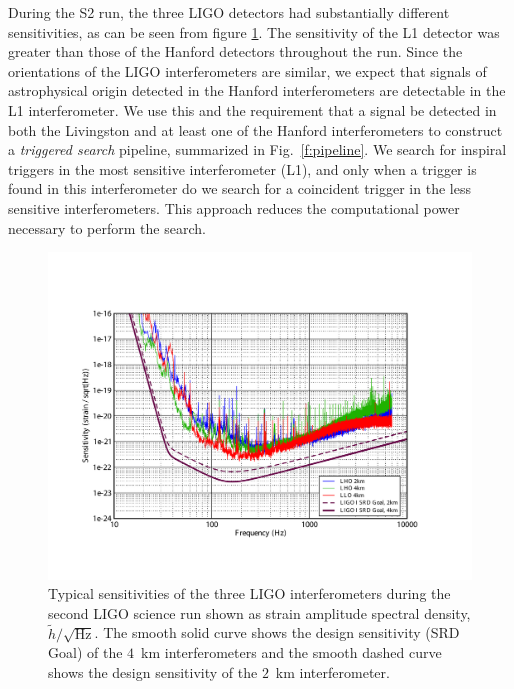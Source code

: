 During the S2 run, the three LIGO detectors had substantially different
sensitivities, as can be seen from figure \ref{f:s2noisecurve}. The
sensitivity of the L1 detector was greater than those of the Hanford detectors
throughout the run. Since the orientations of the LIGO interferometers are
similar, we expect that signals of astrophysical origin detected in the
Hanford interferometers are detectable in the L1 interferometer.  We use this
and the requirement that a signal be detected in both the Livingston and at
least one of the Hanford interferometers to construct a {\em triggered search}
pipeline, summarized in Fig.~\ref{f:pipeline}. We search for inspiral triggers
in the most sensitive interferometer (L1), and only when a trigger is found in
this interferometer do we search for a coincident trigger in the less
sensitive interferometers. This approach reduces the computational power
necessary to perform the search.

\begin{figure}[tbh]
  \vspace{5pt}
  \begin{flushright}
    \includegraphics[width=\textwidth]{figures/pipeline/G030379-00}    
  \end{flushright}
  \caption{%
  Typical sensitivities of the three LIGO interferometers during the second
  LIGO science run\cite{s2noisecurve} shown as strain amplitude spectral
  density, $\tilde{h}/\sqrt{\mathrm{Hz}}$. The smooth solid curve shows the
  design sensitivity (SRD Goal) of the $4$~km interferometers and the smooth
  dashed curve shows the design sensitivity of the $2$~km interferometer.
  }
\label{f:s2noisecurve}
\end{figure}

